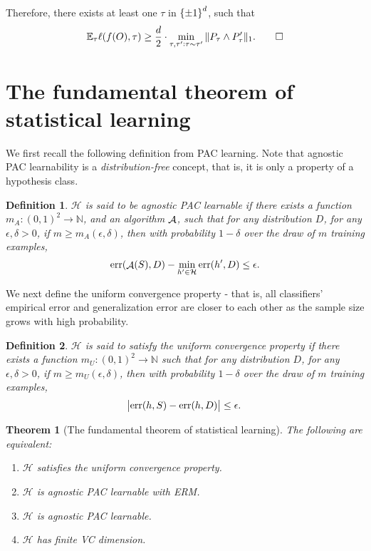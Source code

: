 \documentclass{article}
\newtheorem{theorem}{Theorem}
\newtheorem{definition}{Definition}
\DeclareMathOperator*{\err}{{\rm err}}
\DeclareMathOperator*{\Acal}{{\cal A}}
\newcommand{\EE}{\mathbb{E}}
\newcommand{\NN}{\mathbb{N}}
\newcommand{\Hcal}{\mathcal{H}}
\newcommand{\Ocal}{\mathcal{O}}
\newcommand{\defeq}{\triangleq}
\begin{document}
Therefore, there exists at least one $\tau$ in $\cbr{\pm 1}^d$, such that
\[ \EE_{\tau} \ell(f(O), \tau) \geq \frac{d}{2} \cdot \min_{\tau, \tau': \tau \sim \tau'} \| P_\tau \wedge P_\tau' \|_1. \qed \]


\section{The fundamental theorem of statistical learning}

We first recall the following definition from PAC learning. Note that agnostic PAC learnability is a {\em distribution-free} concept, that is, it is only a property of
a hypothesis class.

\begin{definition}
$\Hcal$ is said to be agnostic PAC learnable if
there exists a function $m_A: (0,1)^2 \to \NN$, and an algorithm $\Acal$, such that for any distribution $D$, for any $\epsilon, \delta > 0$, if $m \geq m_A(\epsilon, \delta)$, then with probability $1-\delta$ over the draw of $m$ training examples,
\[ \err(\Acal(S), D) - \min_{h' \in \Hcal} \err(h',D) \leq \epsilon. \]
\end{definition}

We next define the uniform convergence property - that is, all classifiers' empirical error and generalization error are closer to each other as the sample size grows with high probability.

\begin{definition}
$\Hcal$ is said to satisfy the uniform convergence property if
there exists a function $m_U: (0,1)^2 \to \NN$ such that for any distribution $D$, for any $\epsilon, \delta > 0$, if $m \geq m_U(\epsilon, \delta)$, then with probability $1-\delta$ over the draw of $m$ training examples,
\[ \abs{\err(h, S) - \err(h,D)} \leq \epsilon. \]
\end{definition}

\begin{theorem}[The fundamental theorem of statistical learning]
The following are equivalent:
\begin{enumerate}
\item $\Hcal$ satisfies the uniform convergence property.
\label{item:uc}
\item $\Hcal$ is agnostic PAC learnable with ERM.
\label{item:erm}
\item $\Hcal$ is agnostic PAC learnable.
\label{item:pac}
\item $\Hcal$ has finite VC dimension.
\label{item:vc}
\end{enumerate}
\end{theorem}
\end{document}
